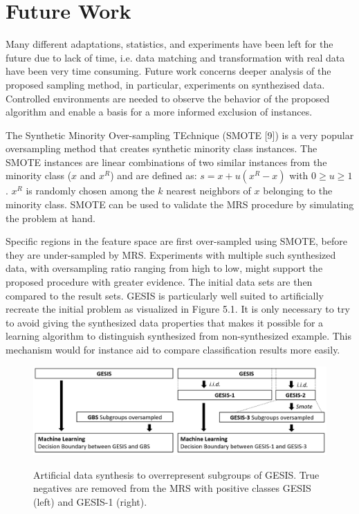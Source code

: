 \chapter{Future Work}\label{Sec:Future Work}

Many diﬀerent adaptations, statistics, and experiments have been left for the future due to lack of time, i.e. data matching and transformation with real data have been very time consuming. Future work concerns deeper analysis of the proposed sampling method, in particular, experiments on synthezised data. Controlled environments are needed to observe the behavior of the proposed algorithm and enable a basis for a more informed exclusion of instances. 

The Synthetic Minority Over-sampling TEchnique (SMOTE [9]) is a very popular oversampling method that creates synthetic minority class instances. The SMOTE instances are linear combinations of two similar instances from the minority class (\(x\) and \(x^{R}\)) and are defined as: \(s = x + u (x^{R} - x) \) with \(0 \geq  u \geq 1\). \(x^{R}\) is randomly chosen among the \(k\) nearest neighbors of \(x\) belonging to the minority class. SMOTE can be used to validate the MRS procedure by simulating the problem at hand.

Specific regions in the feature space are first over-sampled using SMOTE, before they are under-sampled by MRS. Experiments with multiple such synthesized data, with oversampling ratio ranging from high to low, might support the proposed procedure with greater evidence. The initial data sets are then compared to the result sets. GESIS is particularly well suited to artificially recreate the initial problem as visualized in Figure 5.1. It is only necessary to try to avoid giving the synthesized data properties that makes it possible for a learning algorithm to distinguish synthesized from non-synthesized example. This mechanism would for instance aid to compare classification results more easily.

\begin{figure}[ht]
	\begin{center}
\vspace{0.5cm}
		\includegraphics[scale=0.41,angle=0]{fig/procedure2}
		\label{std}
		\caption{Artificial data synthesis to overrepresent subgroups of GESIS. True negatives are removed from the MRS with positive classes GESIS (left) and GESIS-1 (right).}
	\end{center}
\end{figure}